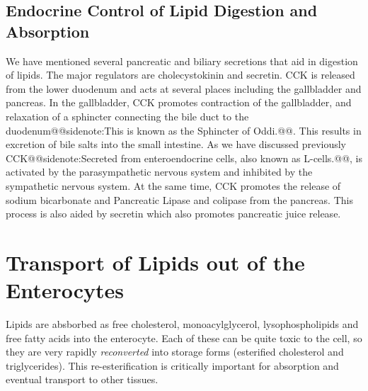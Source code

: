 \documentclass{tufte-handout}
\makeatletter
\def\sidenote#1{@@sidenote:#1@@}
\makeatother
\begin{document}
\subsection{Endocrine Control of Lipid Digestion and Absorption}

We have mentioned several pancreatic and biliary secretions that aid in digestion of lipids.  The major regulators are cholecystokinin and secretin.  CCK is released from the lower duodenum and acts at several places including the gallbladder and pancreas.  In the gallbladder, CCK promotes contraction of the gallbladder, and relaxation of a sphincter connecting the bile duct to the duodenum\sidenote{This is known as the Sphincter of Oddi.}.  This results in excretion of bile salts into the small intestine.  As we have discussed previously CCK\sidenote{Secreted from enteroendocrine cells, also known as L-cells.}, is activated by the parasympathetic nervous system and inhibited by the sympathetic nervous system.  At the same time, CCK promotes the release of sodium bicarbonate and Pancreatic Lipase and colipase from the pancreas.  This process is also aided by secretin which also promotes pancreatic juice release.

\section{Transport of Lipids out of the Enterocytes}

Lipids are absborbed as free cholesterol, monoacylglycerol, lysophospholipids and free fatty acids into the enterocyte.  Each of these can be quite toxic to the cell, so they are very rapidly \emph{reconverted} into storage forms (esterified cholesterol and triglycerides).  This re-esterification is critically important for absorption and eventual transport to other tissues.
\end{document}
